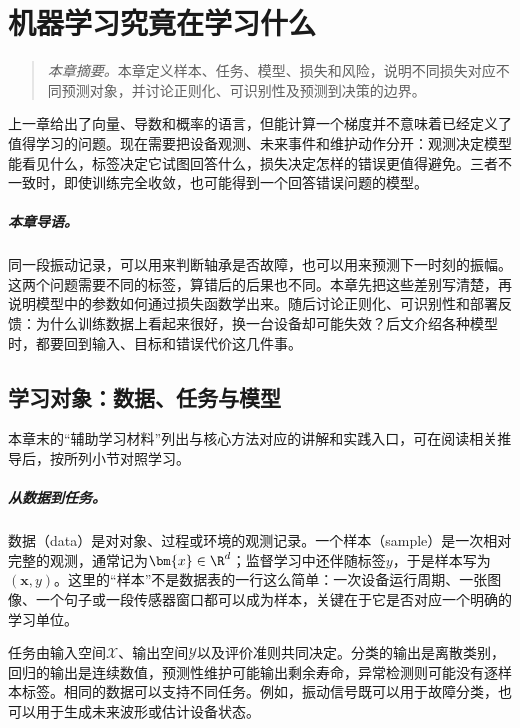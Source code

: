﻿\chapter{机器学习究竟在学习什么}

\begin{quote}\small
\textit{本章摘要。}本章定义样本、任务、模型、损失和风险，说明不同损失对应不同预测对象，并讨论正则化、可识别性及预测到决策的边界。
\end{quote}

上一章给出了向量、导数和概率的语言，但能计算一个梯度并不意味着已经定义了值得学习的问题。现在需要把设备观测、未来事件和维护动作分开：观测决定模型能看见什么，标签决定它试图回答什么，损失决定怎样的错误更值得避免。三者不一致时，即使训练完全收敛，也可能得到一个回答错误问题的模型。

\paragraph{本章导语。}
同一段振动记录，可以用来判断轴承是否故障，也可以用来预测下一时刻的振幅。这两个问题需要不同的标签，算错后的后果也不同。本章先把这些差别写清楚，再说明模型中的参数如何通过损失函数学出来。随后讨论正则化、可识别性和部署反馈：为什么训练数据上看起来很好，换一台设备却可能失效？后文介绍各种模型时，都要回到输入、目标和错误代价这几件事。

\section{学习对象：数据、任务与模型}

本章末的“辅助学习材料”列出与核心方法对应的讲解和实践入口，可在阅读相关推导后，按所列小节对照学习。

\paragraph{从数据到任务。}
数据（data）是对对象、过程或环境的观测记录。一个样本（sample）是一次相对完整的观测，通常记为$\bm{x}\in\R^d$；监督学习中还伴随标签$y$，于是样本写为$(\bm{x},y)$。这里的“样本”不是数据表的一行这么简单：一次设备运行周期、一张图像、一个句子或一段传感器窗口都可以成为样本，关键在于它是否对应一个明确的学习单位。

任务由输入空间$\mathcal{X}$、输出空间$\mathcal{Y}$以及评价准则共同决定。分类的输出是离散类别，回归的输出是连续数值，预测性维护可能输出剩余寿命，异常检测则可能没有逐样本标签。相同的数据可以支持不同任务。例如，振动信号既可以用于故障分类，也可以用于生成未来波形或估计设备状态。

